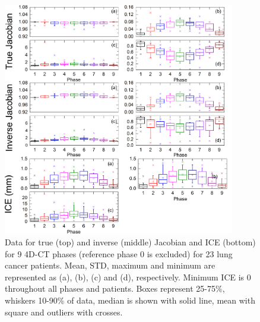 \newpage

\begin{figure}[H]
	\begin{center}		
		\includegraphics[width=0.9\textwidth]{./VisualMotionManagment/Images/Jacobian_data.png}
		\caption{Data for true (top) and inverse (middle) Jacobian and ICE (bottom) for 9 4D-CT phases (reference phase 0 is excluded) for 23 lung cancer patients. Mean, STD, maximum and minimum are represented as (a), (b), (c) and (d), respectively.
		Minimum ICE is 0 throughout all phases and patients. Boxes represent 25-75\%, whiskers 10-90\% of data, median is shown with solid line, mean with square and outliers with crosses.}
		\label{jacobian_data}
	\end{center}
\end{figure}

\newpage




